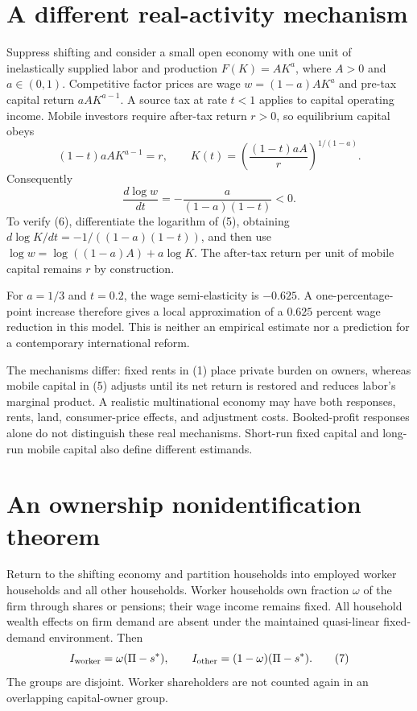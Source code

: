 \documentclass[11pt,a4paper]{article}
\begin{document}
\section{A different real-activity mechanism}
Suppress shifting and consider a small open economy with one unit of inelastically supplied labor and production $F(K)=AK^a$, where $A>0$ and $a\in(0,1)$. Competitive factor prices are wage $w=(1-a)AK^a$ and pre-tax capital return $aAK^{a-1}$. A source tax at rate $t<1$ applies to capital operating income. Mobile investors require after-tax return $r>0$, so equilibrium capital obeys
\[
 (1-t)aAK^{a-1}=r,\qquad
 K(t)=\left(\frac{(1-t)aA}{r}\right)^{1/(1-a)}.
 \tag{5}
\]
Consequently
\[
 \frac{d\log w}{dt}=-\frac{a}{(1-a)(1-t)}<0.
 \tag{6}
\]
To verify (6), differentiate the logarithm of (5), obtaining
$d\log K/dt=-1/((1-a)(1-t))$, and then use
$\log w=\log((1-a)A)+a\log K$. The after-tax return per unit of mobile capital remains $r$ by construction.

For $a=1/3$ and $t=0.2$, the wage semi-elasticity is $-0.625$. A one-percentage-point increase therefore gives a local approximation of a $0.625$ percent wage reduction in this model. This is neither an empirical estimate nor a prediction for a contemporary international reform.

The mechanisms differ: fixed rents in (1) place private burden on owners, whereas mobile capital in (5) adjusts until its net return is restored and reduces labor's marginal product. A realistic multinational economy may have both responses, rents, land, consumer-price effects, and adjustment costs. Booked-profit responses alone do not distinguish these real mechanisms. Short-run fixed capital and long-run mobile capital also define different estimands.
\section{An ownership nonidentification theorem}
Return to the shifting economy and partition households into employed worker households and all other households. Worker households own fraction $\omega$ of the firm through shares or pensions; their wage income remains fixed. All household wealth effects on firm demand are absent under the maintained quasi-linear fixed-demand environment. Then
\[
 I_{\rm worker}=\omega(\Pi-s^*),\qquad
 I_{\rm other}=(1-\omega)(\Pi-s^*).
 \tag{7}
\]
The groups are disjoint. Worker shareholders are not counted again in an overlapping capital-owner group.
\end{document}
